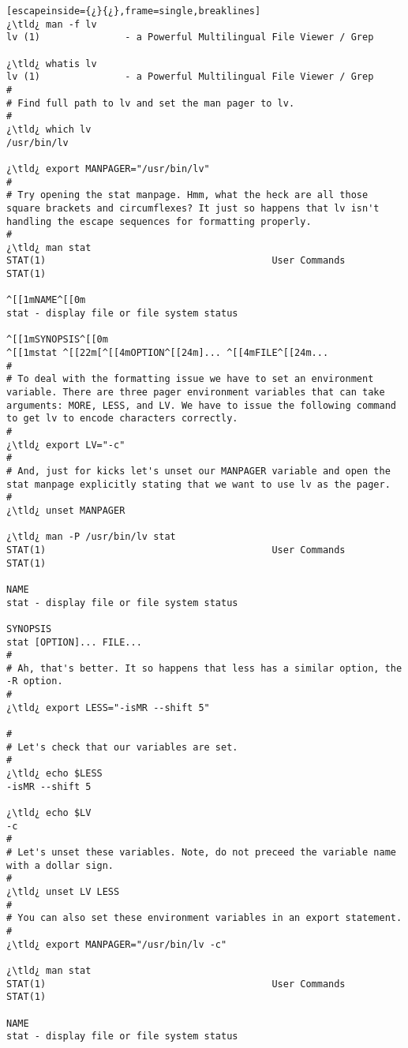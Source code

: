 \begin{lstlisting}[escapeinside={¿}{¿},frame=single,breaklines]
¿\tld¿ man -f lv
lv (1)               - a Powerful Multilingual File Viewer / Grep

¿\tld¿ whatis lv
lv (1)               - a Powerful Multilingual File Viewer / Grep
#
# Find full path to lv and set the man pager to lv.
#
¿\tld¿ which lv
/usr/bin/lv

¿\tld¿ export MANPAGER="/usr/bin/lv"
#
# Try opening the stat manpage. Hmm, what the heck are all those square brackets and circumflexes? It just so happens that lv isn't handling the escape sequences for formatting properly.
#
¿\tld¿ man stat
STAT(1)                                        User Commands                                       STAT(1)

^[[1mNAME^[[0m
stat - display file or file system status

^[[1mSYNOPSIS^[[0m
^[[1mstat ^[[22m[^[[4mOPTION^[[24m]... ^[[4mFILE^[[24m...
#
# To deal with the formatting issue we have to set an environment variable. There are three pager environment variables that can take arguments: MORE, LESS, and LV. We have to issue the following command to get lv to encode characters correctly.
#
¿\tld¿ export LV="-c"
#
# And, just for kicks let's unset our MANPAGER variable and open the stat manpage explicitly stating that we want to use lv as the pager.
#
¿\tld¿ unset MANPAGER

¿\tld¿ man -P /usr/bin/lv stat
STAT(1)                                        User Commands                                       STAT(1)

NAME
stat - display file or file system status

SYNOPSIS
stat [OPTION]... FILE...
#
# Ah, that's better. It so happens that less has a similar option, the -R option.
#
¿\tld¿ export LESS="-isMR --shift 5"

#
# Let's check that our variables are set.
#
¿\tld¿ echo $LESS
-isMR --shift 5

¿\tld¿ echo $LV
-c
#
# Let's unset these variables. Note, do not preceed the variable name with a dollar sign.
#
¿\tld¿ unset LV LESS
#
# You can also set these environment variables in an export statement.
#
¿\tld¿ export MANPAGER="/usr/bin/lv -c"

¿\tld¿ man stat
STAT(1)                                        User Commands                                       STAT(1)

NAME
stat - display file or file system status


\end{lstlisting}
